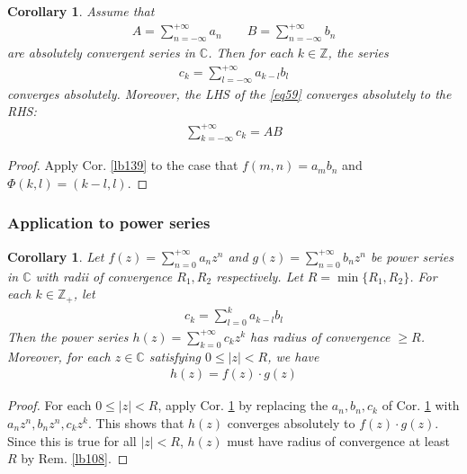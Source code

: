 \documentclass[12pt,b5paper,notitlepage]{article}
\theoremstyle{definition}
\theoremstyle{plain}
\newtheorem{co}[df]{Corollary}
\newcommand{\Cbb}{\mathbb C}
\newcommand{\Zbb}{\mathbb Z}
\newcommand{\dps}{\displaystyle}
\numberwithin{equation}{section}
\begin{document}

\begin{co}\label{lb153}
Assume that
\begin{align*}
A=\sum_{n=-\infty}^{+\infty} a_n\qquad B=\sum_{n=-\infty}^{+\infty}b_n
\end{align*}
are absolutely convergent series in $\Cbb$. Then for each $k\in\Zbb$, the series
\begin{align*}
c_k=\sum_{l=-\infty}^{+\infty}a_{k-l}b_l
\end{align*}
converges absolutely. Moreover, the LHS of the \eqref{eq59} converges absolutely to the RHS:
\begin{align}\label{eq59}
\sum_{k=-\infty}^{+\infty}c_k=AB
\end{align}
\end{co}


\begin{proof}
Apply Cor. \ref{lb139} to the case that $f(m,n)=a_mb_n$ and $\Phi(k,l)=(k-l,l)$.
\end{proof}


\subsubsection{Application to power series}


\begin{co}\label{lb362}
Let $\dps f(z)=\sum_{n=0}^{+\infty}a_nz^n$ and $\dps g(z)=\sum_{n=0}^{+\infty}b_nz^n$ be power series in $\Cbb$ with radii of convergence $R_1,R_2$ respectively. Let $R=\min\{R_1,R_2\}$. For each $k\in\Zbb_+$, let
\begin{align*}
c_k=\sum_{l=0}^k a_{k-l}b_l
\end{align*}
Then the power series $\dps h(z)=\sum_{k=0}^{+\infty}c_kz^k$ has radius of convergence $\geq R$. Moreover, for each $z\in\Cbb$ satisfying $0\leq |z|<R$, we have
\begin{align*}
h(z)=f(z)\cdot g(z)
\end{align*}
\end{co}

\begin{proof}
For each $0\leq |z|<R$, apply Cor. \ref{lb153} by replacing the $a_n,b_n,c_k$ of Cor. \ref{lb153} with $a_nz^n,b_nz^n,c_kz^k$. This shows that $h(z)$ converges absolutely to $f(z)\cdot g(z)$. Since this is true for all $|z|<R$, $h(z)$ must have radius of convergence at least $R$ by Rem. \ref{lb108}.
\end{proof}
\end{document}
